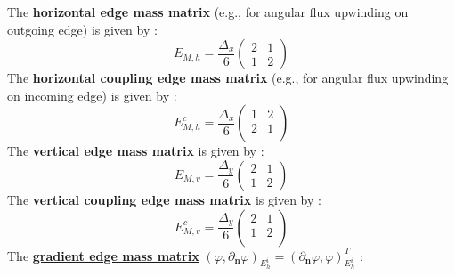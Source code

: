 \documentclass{mc2013}
\newcommand\bs{\boldsymbol}
\newcommand\tf{\varphi}
\renewcommand{\(}{\left(}
\renewcommand{\)}{\right)}
\renewcommand{\[}{\left[}
\renewcommand{\]}{\right]}
\begin{document}
%
%
The {\bf horizontal edge mass matrix} (e.g., for angular flux upwinding on outgoing edge) is given by :
\begin{equation}
E_{M,h} = \frac{{\Delta _x}}{6}
\begin{pmatrix}
2 & 1 \\
1 & 2 
\end{pmatrix}
\end{equation}
%
%
The {\bf horizontal coupling edge mass matrix} (e.g., for angular flux upwinding on incoming edge) is given by :
\begin{equation}
E_{M,h}^c = \frac{{\Delta _x}}{6}
\begin{pmatrix}
1 & 2 \\
2 & 1 \\
\end{pmatrix}
\end{equation}
%
%
The {\bf vertical edge mass matrix} is given by :
\begin{equation}
E_{M,v} = \frac{{\Delta _y}}{6}
\begin{pmatrix}
2 & 1\\
1 & 2
\end{pmatrix}
\end{equation}
%
%
The {\bf vertical coupling edge mass matrix} is given by :
\begin{equation}
E_{M,v}^c = \frac{{\Delta _y}}{6}
\begin{pmatrix}
2 & 1 \\
1 & 2 \\
\end{pmatrix}
\end{equation}
%
%
The \underline{{\bf gradient edge mass matrix}} $(\tf,\partial_{\bs{n}}
\tf)_{E_h^i}=\(\partial_{\bs{n}}\tf,\tf\)_{E_h^i}^T$ :
\end{document}
